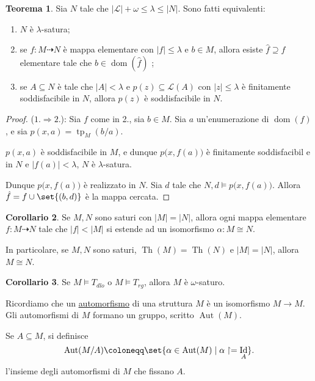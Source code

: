 \documentclass[10pt]{article}
\DeclareMathOperator{\Id}{Id}
\newcommand{\card}[1]{\left\vert #1 \right\vert}
\newcommand{\1}{\mathds{1}}
\newcommand{\partialto}{\dashrightarrow}
\theoremstyle{definition}%
\newtheorem{thm}{Teorema}[section]
\newtheorem{cor}[thm]{Corollario}
\theoremstyle{plain}
\theoremstyle{remark}
\begin{document}
\begin{thm}
Sia \(N\) tale che \(\card{\mathcal{L}}+\omega\le\lambda\le\card{N}\). Sono fatti equivalenti:
\begin{enumerate}
\item \(N\) è \(\lambda\)-satura;
\item se \(f:M\partialto N\) è mappa elementare con \(\card{f}\le \lambda\) e \(b \in M\), allora esiste \(\hat{f}\supseteq f\) elementare tale che \(b \in \operatorname{dom}(\hat{f})\) ;
\item se \(A \subseteq N\) è tale che \(\card{A}<\lambda\) e \(p(z) \subseteq \mathcal{L}(A)\) con \(\card{z}\le\lambda\) è finitamente soddisfacibile in \(N\), allora \(p(z)\) è soddisfacibile in \(N\).
\end{enumerate}
\end{thm}
\begin{proof}
(\(1. \Rightarrow 2.\)): Sia \(f\) come in 2., sia \(b \in M\). Sia \(a\) un'enumerazione di \(\operatorname{dom}(f)\), e sia \(p(x,a)=\operatorname{tp}_{M}(b/a)\).

\(p(x,a)\) è soddisfacibile in \(M\), e dunque \(p\big(x,f(a)\big)\) è finitamente soddisfacibil e in \(N\) e \(\card{f(a)}<\lambda\), \(N\) è \(\lambda\)-satura.

Dunque \(p\big(x,f(a)\big)\) è realizzato in \(N\). Sia \(d\) tale che \(N,d\vDash p\big(x,f(a)\big)\). Allora \(\hat{f}=f\cup\set{(b,d)}\) è la mappa cercata.
\end{proof}

\begin{cor}
Se \(M,N\) sono saturi con \(\card{M}=\card{N}\), allora ogni mappa elementare \(f:M\partialto N\) tale che \(\card{f}<\card{M}\) si estende ad un isomorfismo \(\alpha:M\cong N\).

In particolare, se \(M,N\) sono saturi, \(\operatorname{Th}(M)=\operatorname{Th}(N)\) e \(\card{M}=\card{N}\), allora \(M\cong N\).
\end{cor}
\begin{cor}
Se \(M\vDash T_{dlo}\) o \(M\vDash T_{rg}\), allora \(M\) è \(\omega\)-saturo.
\end{cor}

Ricordiamo che un \uline{automorfismo} di una struttura \(M\) è un isomorfismo \(M\to M\). Gli automorfismi di \(M\) formano un gruppo, scritto \(\operatorname{Aut}(M)\).

Se \(A \subseteq M\), si definisce
\begin{equation*}
\operatorname{Aut}(M/A) \coloneqq\set{\alpha \in \operatorname{Aut}(M) \mid \alpha\upharpoonright=\Id_{A}}.
\end{equation*}
l'insieme degli automorfismi di \(M\) che fissano \(A\).
\end{document}

